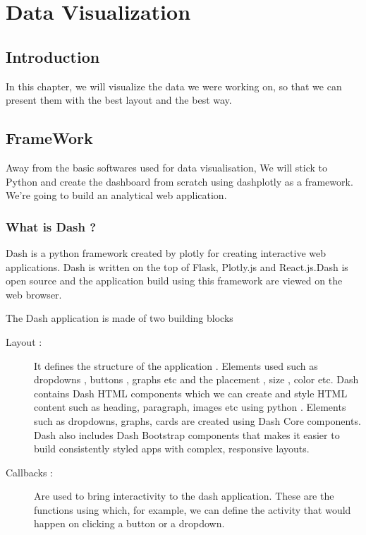 \documentclass[letterpaper,10pt,english]{jupyterBook}
\begin{document}
\chapter{Data Visualization}
\label{\detokenize{Chap3/Chap3:data-visualization}}\label{\detokenize{Chap3/Chap3::doc}}

\section{Introduction}
\label{\detokenize{Chap3/Chap3:introduction}}
\sphinxAtStartPar
In this chapter, we will visualize the data we were working on, so that we can present them with the best layout and the best way.


\section{FrameWork}
\label{\detokenize{Chap3/Chap3:framework}}
\sphinxAtStartPar
Away from the basic softwares used for data visualisation, We will stick to Python and create the dashboard from scratch using dash\sphinxhyphen{}plotly as a framework. We’re going to build an analytical web application.


\subsection{What is Dash ?}
\label{\detokenize{Chap3/Chap3:what-is-dash}}
\sphinxAtStartPar
Dash is a python framework created by plotly for creating interactive web applications. Dash is written on the top of Flask, Plotly.js and React.js.Dash is open source and the application build using this framework are viewed on the web browser.

\sphinxAtStartPar
The Dash application is made of two building blocks
\begin{description}
\item[{Layout :}] \leavevmode
\sphinxAtStartPar
It defines the structure of the application . Elements used such as dropdowns , buttons , graphs etc and the placement , size , color etc. Dash contains Dash HTML components which we can create and style HTML content such as heading, paragraph, images etc using python . Elements such as dropdowns, graphs, cards are created using Dash Core components.
Dash also includes Dash Bootstrap components that makes it easier to build consistently styled apps with complex, responsive layouts.

\item[{Callbacks :}] \leavevmode
\sphinxAtStartPar
Are used to bring interactivity to the dash application. These are the functions using which, for example, we can define the activity that would happen on clicking a button or a dropdown.

\end{description}
\end{document}
